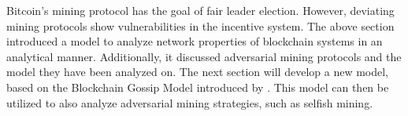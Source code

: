 Bitcoin's mining protocol has the goal of fair leader election. However, deviating mining protocols show vulnerabilities in the incentive system. The above section introduced a model to analyze network properties of blockchain systems in an analytical manner. Additionally, it discussed adversarial mining protocols and the model they have been analyzed on. The next section will develop a new model, based on the Blockchain Gossip Model introduced by \gopalan. This model can then be utilized to also analyze adversarial mining strategies, such as selfish mining.











